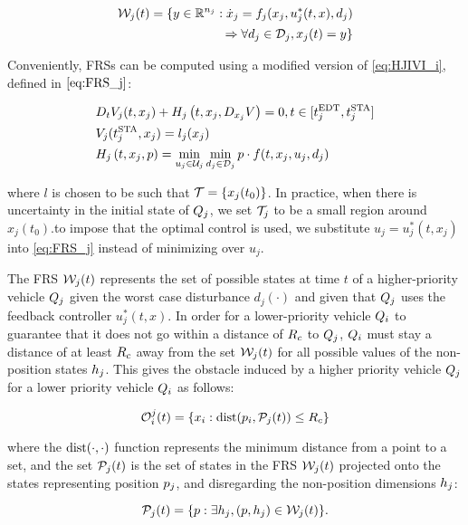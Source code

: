 \begin{equation}
\label{eq:frs}
\begin{aligned}
\mathcal{W}_j(t) = \{y \in \mathbb{R}^{n_j}: \dot{x}_j = f_j(x_j, u_j^*(t, x), d_j) \\
\Rightarrow \forall d_j \in \mathcal{D}_j, x_j(t) = y\}
\end{aligned}
\end{equation}

Conveniently, FRSs can be computed using a modified version of \eqref{eq:HJIVI_i}, defined in $\eqref{eq:FRS_j}$:

\begin{equation}
\label{eq:FRS_j}
\begin{aligned}
&D_t V_j(t, x_j) + H_j\left(t, x_j, D_{x_j} V\right) = 0, t \in [t^\text{EDT}_j, t^\text{STA}_j]\\
&V_j(t^\text{STA}_j, x_j) =l_j(x_j) \\
&H_j\left(t, x_j, p\right) = \min_{u_j \in \mathcal{U}_j} \min_{d_j \in \mathcal{D}_j} p \cdot f(t, x_j, u_j, d_j)
\end{aligned}
\end{equation}

\noindent where $l$ is chosen to be such that $\mathcal{T} = \{x_j(t_0)\}$. In practice, when there is uncertainty in the initial state of $Q_j$, we set $\mathcal{T}_j$ to be a small region around $x_j(t_0)$.to impose that the optimal control is used, we substitute $u_j = u_j^*(t, x_j)$ into \eqref{eq:FRS_j} instead of minimizing over $u_j$.

The FRS $\mathcal{W}_j(t)$ represents the set of possible states at time $t$ of a higher-priority vehicle $Q_j$ given the worst case disturbance $d_j(\cdot)$ and given that $Q_j$ uses the feedback controller $u_j^*(t, x)$. In order for a lower-priority vehicle $Q_i$ to guarantee that it does not go within a distance of $R_c$ to $Q_j$, $Q_i$ must stay a distance of at least $R_c$ away from the set $\mathcal{W}_j(t)$ for all possible values of the non-position states $h_j$. This gives the obstacle induced by a higher priority vehicle $Q_j$ for a lower priority vehicle $Q_i$ as follows:

\begin{equation}
\mathcal{O}_i^j(t) = \{x_i: \text{dist}(p_i, \mathcal{P}_j(t)) \le R_c \}
\end{equation}

\noindent where the $\text{dist}(\cdot, \cdot)$ function represents the minimum distance from a point to a set, and the set $\mathcal{P}_j(t)$ is the set of states in the FRS $\mathcal{W}_j(t)$ projected onto the states representing position $p_j$, and disregarding the non-position dimensions $h_j$:

\begin{equation}
\mathcal{P}_j(t) = \{p: \exists h_j, (p, h_j) \in \mathcal{W}_j(t)\}.
\end{equation}

